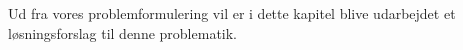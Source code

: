 Ud fra vores problemformulering vil er i dette kapitel blive udarbejdet et løsningsforslag til denne problematik.
